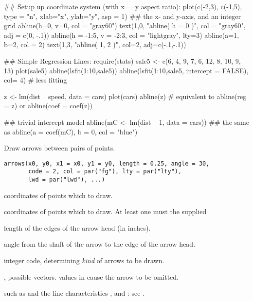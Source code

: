 \begin{Examples}
\begin{ExampleCode}
## Setup up coordinate system (with x==y aspect ratio):
plot(c(-2,3), c(-1,5), type = "n", xlab="x", ylab="y", asp = 1)
## the x- and y-axis, and an integer grid
abline(h=0, v=0, col = "gray60")
text(1,0, "abline( h = 0 )", col = "gray60", adj = c(0, -.1))
abline(h = -1:5, v = -2:3, col = "lightgray", lty=3)
abline(a=1, b=2, col = 2)
text(1,3, "abline( 1, 2 )", col=2, adj=c(-.1,-.1))

## Simple Regression Lines:
require(stats)
sale5 <- c(6, 4, 9, 7, 6, 12, 8, 10, 9, 13)
plot(sale5)
abline(lsfit(1:10,sale5))
abline(lsfit(1:10,sale5, intercept = FALSE), col= 4) # less fitting

z <- lm(dist ~ speed, data = cars)
plot(cars)
abline(z) # equivalent to abline(reg = z) or
abline(coef = coef(z))

## trivial intercept model
abline(mC <- lm(dist ~ 1, data = cars)) ## the same as
abline(a = coef(mC), b = 0, col = "blue")
\end{ExampleCode}
\end{Examples}
%
\begin{Description}\relax
Draw arrows between pairs of points.
\end{Description}
%
\begin{Usage}
\begin{verbatim}
arrows(x0, y0, x1 = x0, y1 = y0, length = 0.25, angle = 30,
       code = 2, col = par("fg"), lty = par("lty"),
       lwd = par("lwd"), ...)
\end{verbatim}
\end{Usage}
%
\begin{Arguments}
\begin{ldescription}
\item[\code{x0, y0}] coordinates of points  which to draw.
\item[\code{x1, y1}] coordinates of points  which to draw.  At least
one must the supplied
\item[\code{length}] length of the edges of the arrow head (in inches).
\item[\code{angle}] angle from the shaft of the arrow to the edge of the
arrow head.
\item[\code{code}] integer code, determining \emph{kind} of arrows to be
drawn.
\item[\code{col, lty, lwd}] , possible vectors.
 values in  cause the arrow to be omitted.
\item[\code{...}]  such as  and the line
characteristics ,  and :
see .
\end{ldescription}
\end{Arguments}
